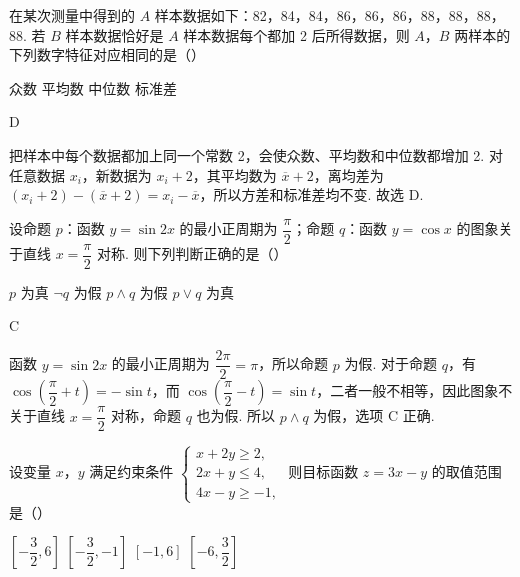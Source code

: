 \begin{problem}
在某次测量中得到的 \(A\) 样本数据如下：82，84，84，86，86，86，88，88，88，88. 若 \(B\) 样本数据恰好是 \(A\) 样本数据每个都加 2 后所得数据，则 \(A\)，\(B\) 两样本的下列数字特征对应相同的是（\quad）

\choices
    {众数}
    {平均数}
    {中位数}
    {标准差}
\end{problem}

\begin{answer}
D
\end{answer}

\begin{solution}
把样本中每个数据都加上同一个常数 2，会使众数、平均数和中位数都增加 2. 对任意数据 \(x_i\)，新数据为 \(x_i+2\)，其平均数为 \(\overline{x}+2\)，离均差为 \((x_i+2)-(\overline{x}+2)=x_i-\overline{x}\)，所以方差和标准差均不变. 故选 D.
\end{solution}

\begin{problem}
设命题 \(p\)：函数 \(y=\sin2x\) 的最小正周期为 \(\dfrac{\pi}{2}\)；命题 \(q\)：函数 \(y=\cos x\) 的图象关于直线 \(x=\dfrac{\pi}{2}\) 对称. 则下列判断正确的是（\quad）

\choices
    {\(p\) 为真}
    {\(\neg q\) 为假}
    {\(p\wedge q\) 为假}
    {\(p\vee q\) 为真}
\end{problem}

\begin{answer}
C
\end{answer}

\begin{solution}
函数 \(y=\sin2x\) 的最小正周期为 \(\dfrac{2\pi}{2}=\pi\)，所以命题 \(p\) 为假. 对于命题 \(q\)，有 \(\cos\left(\dfrac{\pi}{2}+t\right)=-\sin t\)，而 \(\cos\left(\dfrac{\pi}{2}-t\right)=\sin t\)，二者一般不相等，因此图象不关于直线 \(x=\dfrac{\pi}{2}\) 对称，命题 \(q\) 也为假. 所以 \(p\wedge q\) 为假，选项 C 正确.
\end{solution}

\begin{problem}
设变量 \(x\)，\(y\) 满足约束条件
\(\begin{cases}
x+2y\geqslant2,\\
2x+y\leqslant4,\\
4x-y\geqslant-1,
\end{cases}\)
则目标函数 \(z=3x-y\) 的取值范围是（\quad）

\choices
    {\(\left[-\dfrac{3}{2},6\right]\)}
    {\(\left[-\dfrac{3}{2},-1\right]\)}
    {\([-1,6]\)}
    {\(\left[-6,\dfrac{3}{2}\right]\)}
\end{problem}

